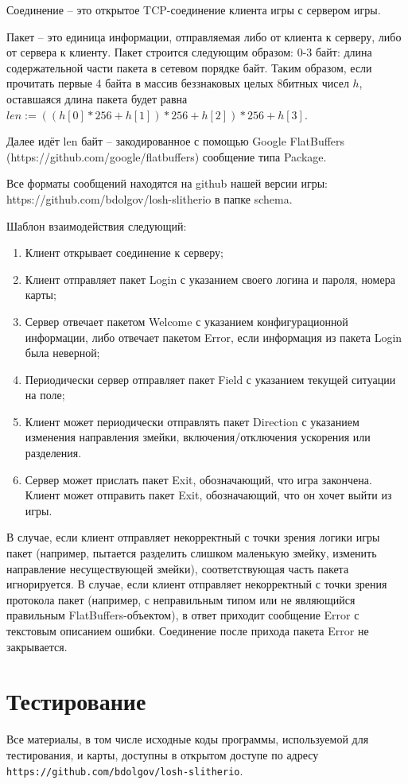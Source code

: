 \documentclass[12pt, a4paper]{article}
\begin{document}
Соединение -- это открытое TCP-соединение клиента игры с сервером игры.

Пакет -- это единица информации, отправляемая либо от клиента к серверу, либо от сервера к клиенту. Пакет строится следующим образом:
0-3 байт: длина содержательной части пакета в сетевом порядке байт. 
Таким образом, если прочитать первые 4 байта в массив беззнаковых целых 8битных чисел $h$, оставшаяся длина пакета будет равна $len := ((h[0] * 256 + h[1]) * 256 + h[2]) * 256 + h[3]$.

Далее идёт len байт -- закодированное с помощью Google FlatBuffers (https://github.com/google/flatbuffers) сообщение типа Package.

Все форматы сообщений находятся на github нашей версии игры: https://github.com/bdolgov/losh-slitherio в папке schema.

Шаблон взаимодействия следующий:
\begin{enumerate}
\item Клиент открывает соединение к серверу;
\item Клиент отправляет пакет Login с указанием своего логина и пароля, номера карты;
\item Сервер отвечает пакетом Welcome с указанием конфигурационной информации, либо отвечает пакетом Error, если информация из пакета Login была неверной;
\item Периодически сервер отправляет пакет Field с указанием текущей ситуации на поле;
\item Клиент может периодически отправлять пакет Direction с указанием изменения направления змейки, включения/отключения ускорения или разделения.
\item Сервер может прислать пакет Exit, обозначающий, что игра закончена. Клиент может отправить пакет Exit, обозначающий, что он хочет выйти из игры.
\end{enumerate}

В случае, если клиент отправляет некорректный с точки зрения логики игры пакет (например, пытается разделить слишком маленькую змейку, изменить направление несуществующей змейки), соответствующая часть пакета игнорируется. В случае, если клиент отправляет некорректный с точки зрения протокола пакет (например, с неправильным типом или не являющийся правильным FlatBuffers-объектом), в ответ приходит сообщение Error с текстовым описанием ошибки. Соединение после прихода пакета Error не закрывается. 

{\section{Тестирование}}

Все материалы, в том числе исходные коды программы, используемой для тестирования, и карты, доступны в открытом доступе по адресу
\texttt{https://github.com/bdolgov/losh-slitherio}.
\end{document}
